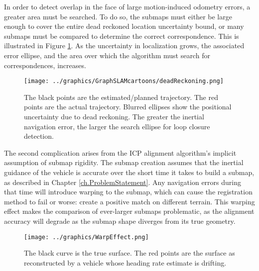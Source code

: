 
In order to detect overlap in the face of large motion-induced odometry errors, a greater area must be searched. To do so, the submaps must either be large enough to cover the entire dead reckoned location uncertainty bound, or many submaps must be compared to determine the correct correspondence. This is illustrated in Figure \ref{fig:BathyMapping3}. As the uncertainty in localization grows, the associated error ellipse, and the area over which the algorithm must search for correspondences, increases.

 \begin{figure}[htb]
   \centering
   \texttt{[image: ../graphics/GraphSLAMcartoons/deadReckoning.png]} %
   \caption{The black points are the estimated/planned trajectory. The red points are the actual trajectory. Blurred ellipses show the positional uncertainty due to dead reckoning. The greater the inertial navigation error, the larger the search ellipse for loop closure detection.  }
   \label{fig:BathyMapping3}
\end{figure}

The second complication arises from the ICP alignment algorithm's implicit assumption of submap rigidity. The submap creation assumes that the inertial guidance of the vehicle is accurate over the short time it takes to build a submap, as described in Chapter \ref{ch.ProblemStatement}. Any navigation errors during that time will introduce warping to the submap, which can cause the registration method to fail or worse: create a positive match on different terrain. This warping effect makes the comparison of ever-larger submaps problematic, as the alignment accuracy will degrade as the submap shape diverges from its true geometry.
 
 \begin{figure}[htb]
   \centering
   \texttt{[image: ../graphics/WarpEffect.png]} %
   \caption{The black curve is the true surface. The red points are the surface as reconstructed by a vehicle whose heading rate estimate is drifting.  }
   \label{fig:WarpingEffects}
\end{figure}

